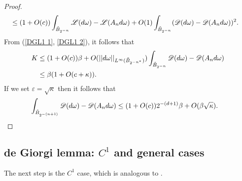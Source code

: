 \begin{proof}
\begin{align*}
&\leq (1 + O(c)) \int_{\tilde B_{2^{-n}}} \mathscr L(d\omega) - \mathscr L(A_n d\omega) + O(1) \int_{\tilde B_{2^{-n}}} (\mathscr D(d\omega) - \mathscr D(A_n d\omega))^2.
\end{align*}
From (\ref{DGL1 1}, \ref{DGL1 2}), it follows that
\begin{align*}
K &\leq (1 + O(c))\beta + O(||d\omega||_{L^\infty(\tilde B_{2^{-n^*}})}) \int_{\tilde B_{2^{-n}}} \mathscr D(d\omega) - \mathscr D(A_n d\omega)\\
&\leq \beta(1 + O(c + \kappa)).
\end{align*}
If we set $\varepsilon = \sqrt \kappa$ then it follows that
\begin{align*}
\int_{\tilde B_{2^{-(n+1)}}} \mathscr D(d\omega) - \mathscr D(A_n d\omega) &\leq (1 + O(c)) 2^{-(d + 1)} \beta + O(\beta \sqrt \kappa). \qedhere
\end{align*}
\end{proof}


\subsection{de Giorgi lemma: \texorpdfstring{$C^1$}{C1} and general cases}
The next step is the $C^1$ case, which is analogous to \cite[Teorema 4.4]{Miranda66}.


